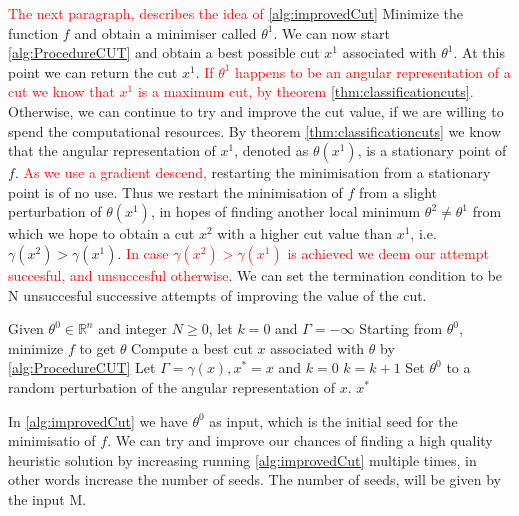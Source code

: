 \documentclass[12pt,a4paper]{article}
\theoremstyle{mythm}
\begin{document}
\textcolor{red}{ The next paragraph, describes the idea of \ref{alg:improvedCut} }
Minimize the function $ f $ and obtain a minimiser called $ \theta^1 $. 
We can now start \ref{alg:ProcedureCUT} and obtain a best possible cut $ x^1 $ associated with $ \theta^1 $.
At this point we can return the cut $ x^1 $.
\textcolor{red}{If $ \theta^1 $ happens to be an angular representation of a cut we know that $ x^1 $ is a maximum cut, by theorem \ref{thm:classificationcuts}.}
Otherwise, we can continue to try and improve the cut value, if we are willing to spend the computational resources. 
By theorem \ref{thm:classificationcuts} we know that the angular representation of $ x^1 $, denoted as $ \theta ( x^1)  $, is a stationary point of $ f $. 
\textcolor{red}{As we use a gradient descend,} restarting the minimisation from a stationary point is of no use.
Thus we restart the minimisation of $ f $ from a slight perturbation of $ \theta (x^1) $, in hopes of finding another local minimum $ \theta^2 \neq \theta^1  $ from which we
hope to obtain a cut $ x^2 $ with a higher cut value than $ x^1 $, i.e. $ \gamma (x^2) > \gamma (x^1)  $.
\textcolor{red}{ In case $ \gamma (x^2) > \gamma (x^1) $ is achieved we deem our attempt succesful, and unsuccesful otherwise. }
We can set the termination condition to be N unsuccesful successive attempts of improving the value of the cut.
\begin{algorithm}
\caption{\ImprovedCut}
\label{alg:improvedCut} 
\begin{algorithmic}[1]
\State Given $ \theta^0 \in \mathbb{R} ^{ n }  $ and integer $ N \geq 0  $, let $ k=0 $ and $ \Gamma = - \infty  $
\State Starting from $ \theta^0 $, minimize $ f $ to get $ \theta  $
\State Compute a best cut $ x $ associated with $ \theta $ by \ref{alg:ProcedureCUT} 
\State Let $ \Gamma = \gamma (x), x^* = x $ and $ k=0 $
\Else
\State $ k = k+1 $
\EndIf
\State Set $ \theta^0 $ to a random perturbation of the angular representation of $ x $.
\EndWhile
\State \Return $ x ^{ * }  $
\EndProcedure
\end{algorithmic}
\end{algorithm}

In \ref{alg:improvedCut} we have $ \theta^0 $ as input, which is the initial seed for the minimisatio of $ f $. We can try and improve our chances of finding a high quality
heuristic solution by increasing running \ref{alg:improvedCut} multiple times, in other words increase the number of seeds. The number of seeds, will be given by the input M.
\end{document}
